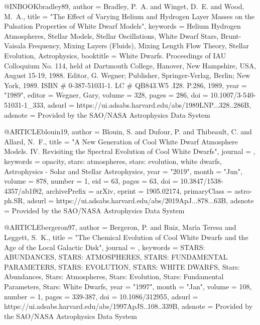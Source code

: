 \documentclass[a4paper,fleqn,usenatbib]{mnras}
\begin{document}
{{{{{{{{{{{@INBOOK{bradley89,
       author = {{Bradley}, P.~A. and {Winget}, D.~E. and {Wood}, M.~A.},
        title = "{The Effect of Varying Helium and Hydrogen Layer Masses on the Pulsation Properties of White Dwarf Models}",
     keywords = {Helium Hydrogen Atmospheres, Stellar Models, Stellar Oscillations, White Dwarf Stars, Brunt-Vaisala Frequency, Mixing Layers (Fluids), Mixing Length Flow Theory, Stellar Evolution, Astrophysics},
    booktitle = {White Dwarfs. Proceedings of IAU Colloquium No. 114, held at Dartmouth College, Hanover, New Hampshire, USA, August 15-19, 1988. Editor, G. Wegner; Publisher, Springer-Verlag, Berlin; New York, 1989. ISBN \# 0-387-51031-1. LC \# QB843.W5 .I28. P.286, 1989},
         year = "1989",
       editor = {{Wegner}, Gary},
       volume = {328},
        pages = {286},
          doi = {10.1007/3-540-51031-1_333},
       adsurl = {https://ui.adsabs.harvard.edu/abs/1989LNP...328..286B},
      adsnote = {Provided by the SAO/NASA Astrophysics Data System}
}

@ARTICLE{blouin19,
       author = {{Blouin}, S. and {Dufour}, P. and {Thibeault}, C. and {Allard}, N.~F.},
        title = "{A New Generation of Cool White Dwarf Atmosphere Models. IV. Revisiting the Spectral Evolution of Cool White Dwarfs}",
      journal = {\apj},
     keywords = {opacity, stars: atmospheres, stars: evolution, white dwarfs, Astrophysics - Solar and Stellar Astrophysics},
         year = "2019",
        month = "Jun",
       volume = {878},
       number = {1},
          eid = {63},
        pages = {63},
          doi = {10.3847/1538-4357/ab1f82},
archivePrefix = {arXiv},
       eprint = {1905.02174},
 primaryClass = {astro-ph.SR},
       adsurl = {https://ui.adsabs.harvard.edu/abs/2019ApJ...878...63B},
      adsnote = {Provided by the SAO/NASA Astrophysics Data System}
}

@ARTICLE{bergeron97,
       author = {{Bergeron}, P. and {Ruiz}, Mar{\'\i}a Teresa and {Leggett}, S.~K.},
        title = "{The Chemical Evolution of Cool White Dwarfs and the Age of the Local Galactic Disk}",
      journal = {\apjs},
     keywords = {STARS: ABUNDANCES, STARS: ATMOSPHERES, STARS: FUNDAMENTAL PARAMETERS, STARS: EVOLUTION, STARS: WHITE DWARFS, Stars: Abundances, Stars: Atmospheres, Stars: Evolution, Stars: Fundamental Parameters, Stars: White Dwarfs},
         year = "1997",
        month = "Jan",
       volume = {108},
       number = {1},
        pages = {339-387},
          doi = {10.1086/312955},
       adsurl = {https://ui.adsabs.harvard.edu/abs/1997ApJS..108..339B},
      adsnote = {Provided by the SAO/NASA Astrophysics Data System}
}

}}}}}}}}}}}
\end{document}
